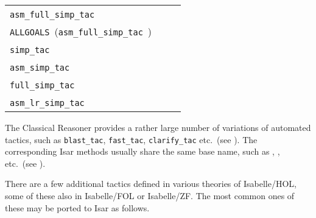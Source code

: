 \begin{isabellebody}
\begin{isamarkuptext}
  \medskip
  \begin{tabular}{lll}
    \verb|asm_full_simp_tac|~\isa{{\isachardoublequote}{\isacharat}{\isacharbraceleft}simpset{\isacharbraceright}\ {\isadigit{1}}{\isachardoublequote}} & & \mbox{\isa{simp}} \\
    \verb|ALLGOALS|~(\verb|asm_full_simp_tac|~\isa{{\isachardoublequote}{\isacharat}{\isacharbraceleft}simpset{\isacharbraceright}{\isachardoublequote}}) & & \mbox{\isa{simp{\isacharunderscore}all}} \\[0.5ex]
    \verb|simp_tac|~\isa{{\isachardoublequote}{\isacharat}{\isacharbraceleft}simpset{\isacharbraceright}\ {\isadigit{1}}{\isachardoublequote}} & & \mbox{\isa{simp}}~\isa{{\isachardoublequote}{\isacharparenleft}no{\isacharunderscore}asm{\isacharparenright}{\isachardoublequote}} \\
    \verb|asm_simp_tac|~\isa{{\isachardoublequote}{\isacharat}{\isacharbraceleft}simpset{\isacharbraceright}\ {\isadigit{1}}{\isachardoublequote}} & & \mbox{\isa{simp}}~\isa{{\isachardoublequote}{\isacharparenleft}no{\isacharunderscore}asm{\isacharunderscore}simp{\isacharparenright}{\isachardoublequote}} \\
    \verb|full_simp_tac|~\isa{{\isachardoublequote}{\isacharat}{\isacharbraceleft}simpset{\isacharbraceright}\ {\isadigit{1}}{\isachardoublequote}} & & \mbox{\isa{simp}}~\isa{{\isachardoublequote}{\isacharparenleft}no{\isacharunderscore}asm{\isacharunderscore}use{\isacharparenright}{\isachardoublequote}} \\
    \verb|asm_lr_simp_tac|~\isa{{\isachardoublequote}{\isacharat}{\isacharbraceleft}simpset{\isacharbraceright}\ {\isadigit{1}}{\isachardoublequote}} & & \mbox{\isa{simp}}~\isa{{\isachardoublequote}{\isacharparenleft}asm{\isacharunderscore}lr{\isacharparenright}{\isachardoublequote}} \\
  \end{tabular}
  \medskip%
\end{isamarkuptext}%
\isamarkuptrue%
%
\isamarkuptrue%
%
\begin{isamarkuptext}%
The Classical Reasoner provides a rather large number of variations
  of automated tactics, such as \verb|blast_tac|, \verb|fast_tac|, \verb|clarify_tac| etc.\ (see \cite{isabelle-ref}).  The corresponding
  Isar methods usually share the same base name, such as \mbox{}, \mbox{}, \mbox{} etc.\ (see
  ).%
\end{isamarkuptext}%
\isamarkuptrue%
%
\isamarkuptrue%
%
\begin{isamarkuptext}%
There are a few additional tactics defined in various theories of
  Isabelle/HOL, some of these also in Isabelle/FOL or Isabelle/ZF.
  The most common ones of these may be ported to Isar as follows.


\end{isamarkuptext}
\end{isabellebody}
